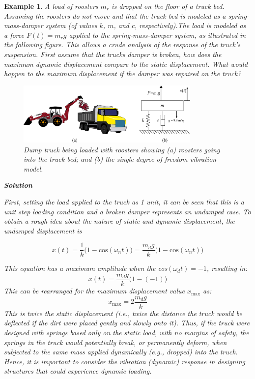 \documentclass[12pt,letter]{article}
\newtheorem{ex}{Example}
\numberwithin{ex}{section} %
\newenvironment{example}{\begin{mdframed}[middlelinewidth=0.5mm]\begin{ex}\normalfont}{\end{ex}\end{mdframed}}
\begin{document}
\begin{example}
A load of roosters $m_r$ is dropped on the floor of a truck bed. Assuming the roosters do not move and that the truck bed is modeled as a spring-mass-damper system (of values $k$, $m$, and $c$, respectively).The load is modeled as a force $F(t) = m_r g$ applied to the spring-mass-damper system, as illustrated
in the following figure. This allows a crude analysis of the response of the truck's suspension. First assume that the trucks damper is broken, how does the maximum dynamic displacement compare to the static displacement. What would happen to the maximum displacement if the damper was repaired on the truck? %

\begin{figure}[H]
	\centering
	\includegraphics[width=0.8\textwidth]{../Figures/dump_truck_example.png}
	\caption{Dump truck being loaded with roosters showing (a) roosters going into the truck bed; and (b) the single-degree-of-freedom vibration model.}
\end{figure}

\textbf{Solution }

First, setting the load applied to the truck as 1 unit, it can be seen that this is a unit step loading condition and a broken damper represents an undamped case. To obtain a rough idea about the nature of static and dynamic displacement, the undamped displacement is

\begin{equation}
	x(t) = \frac{1}{k}\big(1-\text{cos}(\omega_n t)\big) = \frac{m_dg}{k}\big(1-\text{cos}(\omega_n t)\big)
\end{equation}
 
This equation has a maximum amplitude when the cos$(\omega_dt)=-1$, resulting in:
\begin{equation}
	x(t) = \frac{m_dg}{k}\big(1-(-1)\big)
\end{equation}
This can be rearranged for the maximum displacement value $x_\text{max} $ as:
\begin{equation}
	x_\text{max} = 2\frac{m_dg}{k}
\end{equation} 
This is twice the static displacement (i.e., twice the distance the truck would be deflected if the dirt were placed gently and slowly onto it). Thus, if the truck were designed with springs based only on the static load, with no margins of safety, the springs in the truck
would potentially break, or permanently deform, when subjected to the same mass applied dynamically (e.g., dropped) into the truck. Hence, it is important to consider the vibration (dynamic) response in designing structures that could experience dynamic loading.


\end{example}
\end{document}
